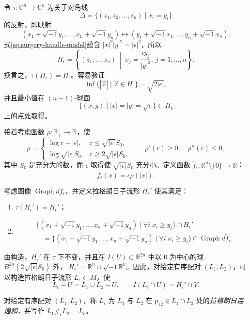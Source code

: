 令 $\tau:\mathbb C^n\to\mathbb C^n$ 为关于对角线
\[
 \Delta=\{(z_1,z_2,\ldots,z_n)\mid x_i=y_i\}
\]
的反射，即映射
\[
 (x_1+\sqrt{-1}y_1,\ldots,x_n+\sqrt{-1}y_n)
 \longmapsto
 (y_1+\sqrt{-1}x_1,\ldots,y_n+\sqrt{-1}x_n).
\]
式\eqref{eq:surgery-handle-model}蕴含 $|x|^2|y|^2=|\epsilon|^2$，所以
\[
 H_\epsilon=
 \left\{(z_1,\ldots,z_n)\ \middle|\
 x_j=\frac{\epsilon y_j}{|y|^2},\ j=1,\ldots,n\right\}.
\]
换言之，$\tau(H_\epsilon)=H_\epsilon$。容易验证
\[
 \inf\{|\vec z|\mid\vec z\in H_\epsilon\}=\sqrt{2|\epsilon|},
\]
并且最小值在 $(n-1)$-球面
\[
 \{(x,y)\mid |x|=|y|=\sqrt\epsilon\}\subset H_\epsilon
\]
上的点处取得。

接着考虑函数 $\rho:\mathbb R_+\to\mathbb R$，使
\[
 \rho=
 \begin{cases}
  \log r-|\epsilon|,&r\le\sqrt{|\epsilon|}S_0,\\
  \log\sqrt{|\epsilon|}S_0,&r\ge2\sqrt{|\epsilon|}S_0,
 \end{cases}
 \qquad
 \rho'(r)\ge0,\quad\rho''(r)\le0,
\]
其中 $S_0$ 是充分大的数，而 $\epsilon$ 取得使
$\sqrt{|\epsilon|}S_0$ 充分小。定义函数
$\widetilde f_\epsilon:\mathbb R^n\setminus\{0\}\to\mathbb R$：
\begin{equation}
 \widetilde f_\epsilon(x)=\epsilon\rho(|x|).
 \label{eq:cutoff-surgery-function}
\end{equation}

考虑图像 $\operatorname{Graph}d\widetilde f_\epsilon$，并定义拉格朗日子流形 $H_\epsilon'$ 使其满足：
\begin{enumerate}[label=(\arabic*)]
\item $\tau(H_\epsilon')=H_\epsilon'$；
\item
\[
\begin{aligned}
 &\{(x_1+\sqrt{-1}y_1,\ldots,x_n+\sqrt{-1}y_n)
       \mid \forall i\;x_i\ge y_i\}\cap H_\epsilon'\\
 &\quad=
 \{(x_1+\sqrt{-1}y_1,\ldots,x_n+\sqrt{-1}y_n)
       \mid \forall i\;x_i\ge y_i\}
       \cap\operatorname{Graph}d\widetilde f_\epsilon.
\end{aligned}
\]
\end{enumerate}
由构造，$H_\epsilon'$ 在 $\tau$ 下不变，并且在
$I(U)\subset\mathbb R^{2n}$ 中以 $0$ 为中心的球
$B^{2n}(2\sqrt{|\epsilon|}S_0)$ 外，
$H_\epsilon'=\mathbb R^n\cup\sqrt{-1}\mathbb R^n$。因此，对给定有序配对
$(L_1,L_2)$，可以构造拉格朗日子流形 $L_\epsilon\subset M$，使
\[
 L_\epsilon-U=L_1\cup L_2-U,\qquad
 I(L_\epsilon\cap U)=H_\epsilon'\cap V.
\]

\begin{definition}\label{def:lagrangian-connected-sum}
对给定有序配对 $(L_1,L_2)$，称 $L_\epsilon$ 为 $L_1$ 与 $L_2$ 在
$p_{12}\in L_1\cap L_2$ 处的\emph{拉格朗日连通和}，并写作
$L_1\#_\epsilon L_2=L_\epsilon$。
\end{definition}

